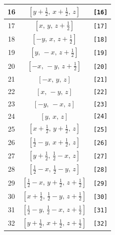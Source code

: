 \documentclass[fleqn,8pt]{jsarticle}
\begin{document}
\begin{longtable}{ccc}
16 & $\left[ y + \frac{1}{2},\, x + \frac{1}{2},\, z \right]$ & {\tt [16]} \\ \hline
17 & $\left[ x,\, y,\, z + \frac{1}{2} \right]$ & {\tt [17]} \\ \hline
18 & $\left[ - y,\, x,\, z + \frac{1}{2} \right]$ & {\tt [18]} \\ \hline
19 & $\left[ y,\, - x,\, z + \frac{1}{2} \right]$ & {\tt [19]} \\ \hline
20 & $\left[ - x,\, - y,\, z + \frac{1}{2} \right]$ & {\tt [20]} \\ \hline
21 & $\left[ - x,\, y,\, z \right]$ & {\tt [21]} \\ \hline
22 & $\left[ x,\, - y,\, z \right]$ & {\tt [22]} \\ \hline
23 & $\left[ - y,\, - x,\, z \right]$ & {\tt [23]} \\ \hline
24 & $\left[ y,\, x,\, z \right]$ & {\tt [24]} \\ \hline
25 & $\left[ x + \frac{1}{2},\, y + \frac{1}{2},\, z \right]$ & {\tt [25]} \\ \hline
26 & $\left[ \frac{1}{2} - y,\, x + \frac{1}{2},\, z \right]$ & {\tt [26]} \\ \hline
27 & $\left[ y + \frac{1}{2},\, \frac{1}{2} - x,\, z \right]$ & {\tt [27]} \\ \hline
28 & $\left[ \frac{1}{2} - x,\, \frac{1}{2} - y,\, z \right]$ & {\tt [28]} \\ \hline
29 & $\left[ \frac{1}{2} - x,\, y + \frac{1}{2},\, z + \frac{1}{2} \right]$ & {\tt [29]} \\ \hline
30 & $\left[ x + \frac{1}{2},\, \frac{1}{2} - y,\, z + \frac{1}{2} \right]$ & {\tt [30]} \\ \hline
31 & $\left[ \frac{1}{2} - y,\, \frac{1}{2} - x,\, z + \frac{1}{2} \right]$ & {\tt [31]} \\ \hline
32 & $\left[ y + \frac{1}{2},\, x + \frac{1}{2},\, z + \frac{1}{2} \right]$ & {\tt [32]} \\
\end{longtable}
\end{document}
